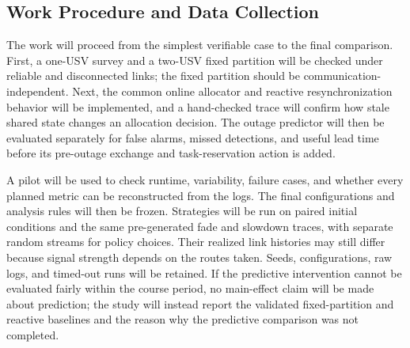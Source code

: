 \subsection{Work Procedure and Data Collection}

The work will proceed from the simplest verifiable case to the final comparison. First, a one-USV survey and a two-USV fixed partition will be checked under reliable and disconnected links; the fixed partition should be communication-independent. Next, the common online allocator and reactive resynchronization behavior will be implemented, and a hand-checked trace will confirm how stale shared state changes an allocation decision. The outage predictor will then be evaluated separately for false alarms, missed detections, and useful lead time before its pre-outage exchange and task-reservation action is added.

A pilot will be used to check runtime, variability, failure cases, and whether every planned metric can be reconstructed from the logs. The final configurations and analysis rules will then be frozen. Strategies will be run on paired initial conditions and the same pre-generated fade and slowdown traces, with separate random streams for policy choices. Their realized link histories may still differ because signal strength depends on the routes taken. Seeds, configurations, raw logs, and timed-out runs will be retained. If the predictive intervention cannot be evaluated fairly within the course period, no main-effect claim will be made about prediction; the study will instead report the validated fixed-partition and reactive baselines and the reason why the predictive comparison was not completed.

